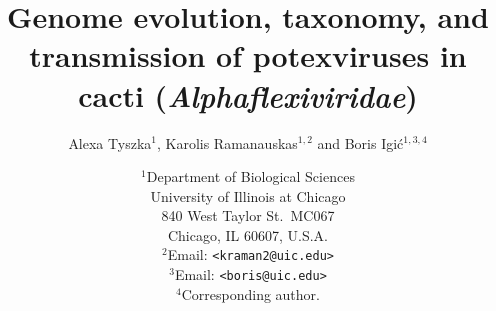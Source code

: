 \documentclass[11pt,letterpaper,titlepage]{article}
\begin{document}
\title{\Large\bf{Genome evolution, taxonomy, and transmission of potexviruses in cacti (\textit{Alphaflexiviridae})}}
\author{Alexa Tyszka$^{1}$, Karolis Ramanauskas$^{1,2}$ and Boris Igi\'{c}$^{1,3,4}$}
\date{
    $^1$Department of Biological Sciences\\
    University of Illinois at Chicago\\
    840 West Taylor St.\ MC067\\
    Chicago, IL 60607, U.S.A.\\
    [\baselineskip]
    $^2$Email: {\tt<kraman2@uic.edu>}\\
    $^3$Email: {\tt<boris@uic.edu>}\\
    $^4$Corresponding author.\\
}
\maketitle

\end{document}
